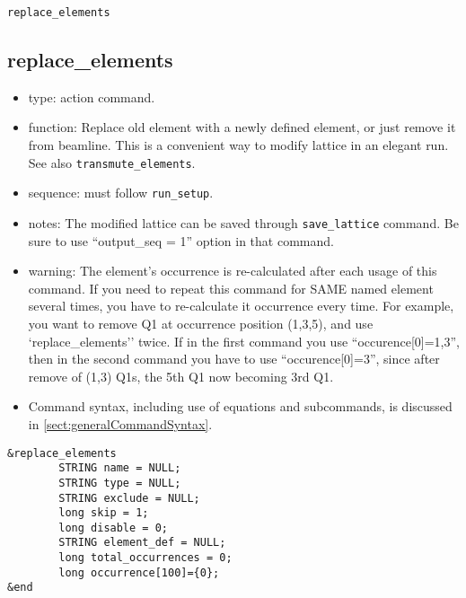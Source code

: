 \documentclass[11pt]{article}
\begin{document}
\newpage
\begin{center}{\Large\verb|replace_elements|}\end{center}
\subsection{replace\_elements \label{subsec:replaceelements}}

\begin{itemize}
\item type: action command.
\item function: Replace old element with a newly defined element, or just 
   remove it from beamline. This is a convenient way to modify lattice in an elegant run.
   See also \verb|transmute_elements|.
\item sequence: must follow \verb|run_setup|.
\item notes: 
	The modified lattice can be saved through \verb|save_lattice|
   command. Be sure to use ``output\_seq = 1'' option in that command.  
\item warning:
   The element's occurrence is re-calculated after each usage of this command. If 
   you need to repeat this command for SAME named element several times, you have to re-calculate 
   it occurrence every time. For example, you want to remove Q1 at occurrence position 
   (1,3,5), and use 
   `replace\_elements'' twice. If in the first command you use ``occurence[0]=1,3'',
   then in the second command you have to use ``occurence[0]=3'', since after remove of
   (1,3) Q1s, the 5th Q1 now becoming 3rd Q1.
\item Command syntax, including use of equations and subcommands, is discussed in \ref{sect:generalCommandSyntax}.
\end{itemize}

\begin{verbatim}
&replace_elements
        STRING name = NULL;
        STRING type = NULL;
        STRING exclude = NULL;
        long skip = 1;
        long disable = 0;
        STRING element_def = NULL;
        long total_occurrences = 0;
        long occurrence[100]={0};
&end
\end{verbatim}
\end{document}
